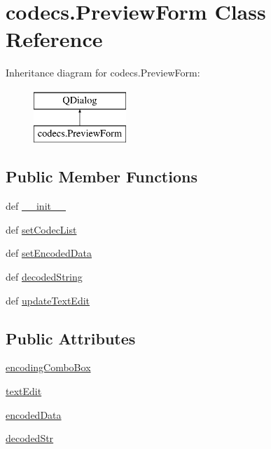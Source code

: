 \hypertarget{classcodecs_1_1PreviewForm}{}\section{codecs.\+Preview\+Form Class Reference}
\label{classcodecs_1_1PreviewForm}
Inheritance diagram for codecs.\+Preview\+Form\+:\begin{figure}[H]
\begin{center}
\leavevmode
\includegraphics[height=2.000000cm]{classcodecs_1_1PreviewForm}
\end{center}
\end{figure}
\subsection*{Public Member Functions}
\begin{DoxyCompactItemize}
\item 
def \hyperlink{classcodecs_1_1PreviewForm_adcd80bd9313fa052dd68567a9a7286f9}{\+\_\+\+\_\+init\+\_\+\+\_\+}
\item 
def \hyperlink{classcodecs_1_1PreviewForm_a4b7fe4f83c29b63a8b69ea9fa5fdc818}{set\+Codec\+List}
\item 
def \hyperlink{classcodecs_1_1PreviewForm_a7b17caeb13baf67631b1e53d62b829a2}{set\+Encoded\+Data}
\item 
def \hyperlink{classcodecs_1_1PreviewForm_a36ec3ad53da45434a64d44ba239e5596}{decoded\+String}
\item 
def \hyperlink{classcodecs_1_1PreviewForm_a4afb3eb750e71f6e39425ef91b0d4c84}{update\+Text\+Edit}
\end{DoxyCompactItemize}
\subsection*{Public Attributes}
\begin{DoxyCompactItemize}
\item 
\hyperlink{classcodecs_1_1PreviewForm_a672ca7a9c1efe89a8be114472e0a6139}{encoding\+Combo\+Box}
\item 
\hyperlink{classcodecs_1_1PreviewForm_ac731e5b6242e70f9f853c3611ec4c980}{text\+Edit}
\item 
\hyperlink{classcodecs_1_1PreviewForm_acde5829eef06b1bf5b46e31bd7383d59}{encoded\+Data}
\item 
\hyperlink{classcodecs_1_1PreviewForm_ab9815a7f5f65d9d93da1685f10135d3b}{decoded\+Str}
\end{DoxyCompactItemize}


